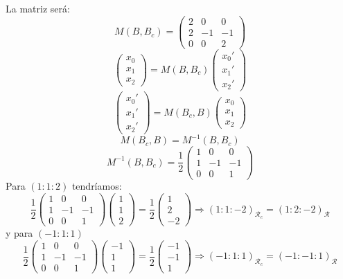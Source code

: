 \documentclass[10pt,a4paper,openright]{book}
\theoremstyle{break}
\begin{document}
La matriz será:
\[
    M\left( B, B_c \right) = \begin{pmatrix} 2 &  0 & 0\\ 2 & -1 & -1\\ 0 & 0 & 2 \end{pmatrix} 
\]\[
\begin{pmatrix} x_0\\ x_1\\ x_2 \end{pmatrix} = M\left( B, B_c \right) \begin{pmatrix} x_0'\\ x_1'\\ x_2' \end{pmatrix} 
\]\[
\begin{pmatrix} x_0'\\ x_1'\\ x_2' \end{pmatrix} = M\left( B_c, B \right) \begin{pmatrix} x_0\\ x_1\\ x_2 \end{pmatrix} 
\]\[
M\left( B_c, B \right) = M^{-1}\left( B, B_c \right) 
\]\[
    M^{-1}\left( B, B_c \right) = \frac{1}{2} \begin{pmatrix} 1 & 0 & 0\\ 1 & -1 & -1\\ 0 & 0 & 1 \end{pmatrix} 
\]
Para $\left( 1 : 1 : 2 \right)$ tendríamos:
\[
\frac{1}{2} \begin{pmatrix} 1 & 0 & 0\\ 1 & -1 & -1\\ 0 & 0 & 1 \end{pmatrix} \begin{pmatrix} 1\\ 1\\ 2 \end{pmatrix} = \frac{1}{2} \begin{pmatrix} 1\\ 2\\ -2 \end{pmatrix} \Rightarrow \left( 1 : 1 : -2 \right)_{\mathcal{R}_c} = \left( 1 : 2 : -2 \right)_{\mathcal{R}} 
\]
y para $\left( -1 : 1 : 1 \right)$
\[
\frac{1}{2} \begin{pmatrix} 1 & 0 & 0\\ 1 & -1 & -1\\ 0 & 0 & 1 \end{pmatrix} \begin{pmatrix} -1\\ 1\\ 1 \end{pmatrix} = \frac{1}{2} \begin{pmatrix} -1\\ -1\\ 1 \end{pmatrix} \Rightarrow \left( -1 : 1 : 1 \right)_{\mathcal{R}_c} = \left( -1 : -1 : 1 \right)_{\mathcal{R}} 
\]
\end{document}
